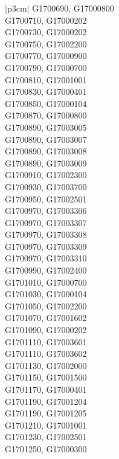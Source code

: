 \begin{customLongTable}{ |p{3cm}| }
G1700690, G17000800 \\ \hline
G1700710, G17000202 \\ \hline
G1700730, G17000202 \\ \hline
G1700750, G17002200 \\ \hline
G1700770, G17000900 \\ \hline
G1700790, G17000700 \\ \hline
G1700810, G17001001 \\ \hline
G1700830, G17000401 \\ \hline
G1700850, G17000104 \\ \hline
G1700870, G17000800 \\ \hline
G1700890, G17003005 \\ \hline
G1700890, G17003007 \\ \hline
G1700890, G17003008 \\ \hline
G1700890, G17003009 \\ \hline
G1700910, G17002300 \\ \hline
G1700930, G17003700 \\ \hline
G1700950, G17002501 \\ \hline
G1700970, G17003306 \\ \hline
G1700970, G17003307 \\ \hline
G1700970, G17003308 \\ \hline
G1700970, G17003309 \\ \hline
G1700970, G17003310 \\ \hline
G1700990, G17002400 \\ \hline
G1701010, G17000700 \\ \hline
G1701030, G17000104 \\ \hline
G1701050, G17002200 \\ \hline
G1701070, G17001602 \\ \hline
G1701090, G17000202 \\ \hline
G1701110, G17003601 \\ \hline
G1701110, G17003602 \\ \hline
G1701130, G17002000 \\ \hline
G1701150, G17001500 \\ \hline
G1701170, G17000401 \\ \hline
G1701190, G17001204 \\ \hline
G1701190, G17001205 \\ \hline
G1701210, G17001001 \\ \hline
G1701230, G17002501 \\ \hline
G1701250, G17000300 \\ \hline

\end{customLongTable}

